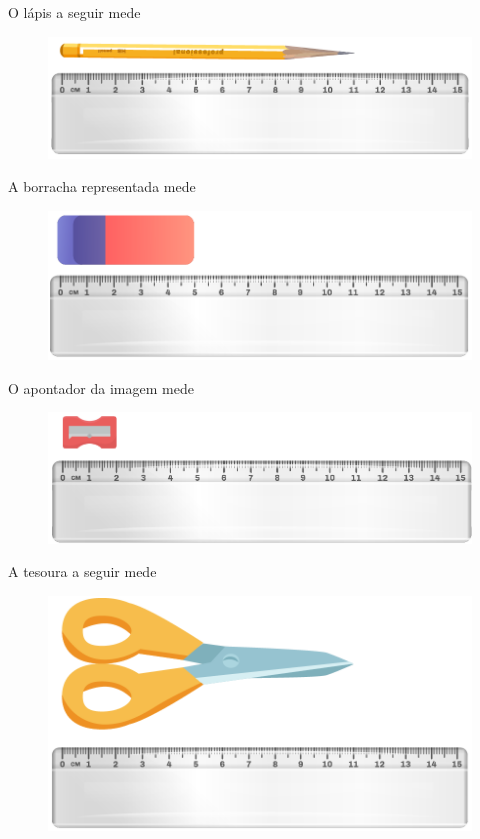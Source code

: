 \begin{escolha}
\item O lápis a seguir mede \reduline{11 cm\hfill}

\begin{figure}[htpb!]
\centering
\includegraphics[width=.6\textwidth]{../ilustracoes/MAT5/SAEB_5ANO_MAT_figura7.png}
\end{figure}

\item A borracha representada mede \reduline{5 cm\hfill}

\begin{figure}[htpb!]
\centering
\includegraphics[width=.6\textwidth]{../ilustracoes/MAT5/SAEB_5ANO_MAT_figura8.png}
\end{figure}

\pagebreak
\item O apontador da imagem mede \reduline{3 cm\hfill}

\begin{figure}[htpb!]
\centering
\includegraphics[width=.6\textwidth]{../ilustracoes/MAT5/SAEB_5ANO_MAT_figura9.png}
\end{figure}

\item A tesoura a seguir mede \reduline{10 cm\hfill}

\begin{figure}[htpb!]
\centering
\includegraphics[width=.6\textwidth]{../ilustracoes/MAT5/SAEB_5ANO_MAT_figura10.png}
\end{figure}

\end{escolha}


